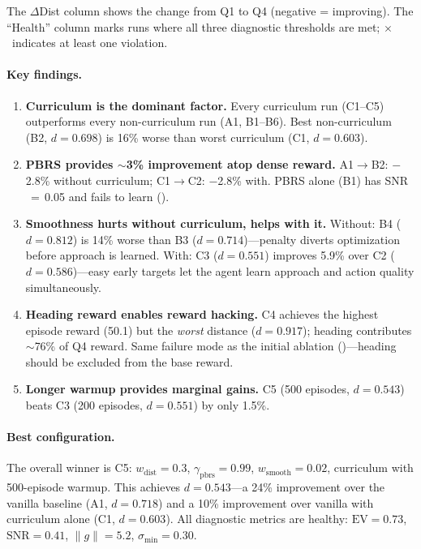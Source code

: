 \documentclass[11pt]{article}
\begin{document}
\noindent
The $\Delta$Dist column shows the change from Q1 to Q4 (negative = improving).
The ``Health'' column marks runs where all three diagnostic thresholds are met; $\times$~indicates at least one violation.

\paragraph{Key findings.}

\begin{enumerate}
  \item \textbf{Curriculum is the dominant factor.}
  Every curriculum run (C1--C5) outperforms every non-curriculum run (A1, B1--B6).
  Best non-curriculum (B2, $d{=}0.698$) is 16\% worse than worst curriculum (C1, $d{=}0.603$).

  \item \textbf{PBRS provides ${\sim}$3\% improvement atop dense reward.}
  A1$\to$B2: $-$2.8\% without curriculum; C1$\to$C2: $-$2.8\% with.
  PBRS alone (B1) has SNR$\,{=}\,$0.05 and fails to learn ().

  \item \textbf{Smoothness hurts without curriculum, helps with it.}
  Without: B4 ($d{=}0.812$) is 14\% worse than B3 ($d{=}0.714$)---penalty diverts optimization before approach is learned.
  With: C3 ($d{=}0.551$) improves 5.9\% over C2 ($d{=}0.586$)---easy early targets let the agent learn approach and action quality simultaneously.

  \item \textbf{Heading reward enables reward hacking.}
  C4 achieves the highest episode reward (50.1) but the \emph{worst} distance ($d{=}0.917$); heading contributes ${\sim}$76\% of Q4 reward.
  Same failure mode as the initial ablation ()---heading should be excluded from the base reward.

  \item \textbf{Longer warmup provides marginal gains.}
  C5 (500 episodes, $d{=}0.543$) beats C3 (200 episodes, $d{=}0.551$) by only 1.5\%.
\end{enumerate}

\paragraph{Best configuration.}
The overall winner is C5: $w_{\text{dist}} = 0.3$, $\gamma_{\text{pbrs}} = 0.99$, $w_{\text{smooth}} = 0.02$, curriculum with 500-episode warmup.
This achieves $d = 0.543$---a 24\% improvement over the vanilla baseline (A1, $d = 0.718$) and a 10\% improvement over vanilla with curriculum alone (C1, $d = 0.603$).
All diagnostic metrics are healthy: $\text{EV} = 0.73$, $\text{SNR} = 0.41$, $\lVert g \rVert = 5.2$, $\sigma_{\min} = 0.30$.
\end{document}
